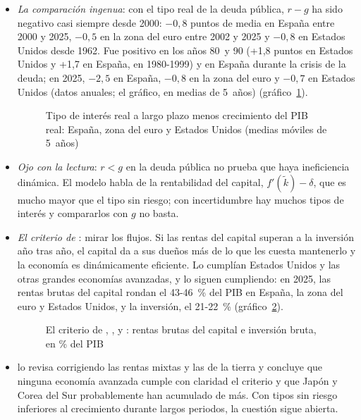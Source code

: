 \documentclass[11pt]{article}
\begin{document}
\begin{itemize}
\item \emph{La comparación ingenua}: con el tipo real de la deuda pública, $r-g$ ha sido negativo casi siempre desde 2000: $-0{,}8$ puntos de media en España entre 2000 y 2025, $-0{,}5$ en la zona del euro entre 2002 y 2025 y $-0{,}8$ en Estados Unidos desde 1962. Fue positivo en los años 80~y 90 (+1,8 puntos en Estados Unidos y +1,7 en España, en 1980-1999) y en España durante la crisis de la deuda; en 2025, $-2{,}5$ en España, $-0{,}8$ en la zona del euro y $-0{,}7$ en Estados Unidos (datos anuales; el gráfico, en medias de 5~años)\nocite{CE2026AMECO} (gráfico~\ref{fig:r-menos-g}).
  \begin{figure}[H]
  \centering
  \caption{Tipo de interés real a largo plazo menos crecimiento del PIB real: España, zona del euro y Estados Unidos (medias móviles de 5~años)}\label{fig:r-menos-g}
  \end{figure}
\item \emph{Ojo con la lectura}: $r<g$ en la deuda pública no prueba que haya ineficiencia dinámica. El modelo habla de la rentabilidad del capital, $f'(\tilde k)-\delta$, que es mucho mayor que el tipo sin riesgo; con incertidumbre hay muchos tipos de interés y compararlos con $g$ no basta\nocite{AbelEtAl1989Assessing,Blanchard2019Deuda}.
\item \emph{El criterio de \textcite{AbelEtAl1989Assessing}}: mirar los flujos. Si las rentas del capital superan a la inversión año tras año, el capital da a sus dueños más de lo que les cuesta mantenerlo y la economía es dinámicamente eficiente. Lo cumplían Estados Unidos y las otras grandes economías avanzadas, y lo siguen cumpliendo: en 2025, las rentas brutas del capital rondan el 43-46~\% del PIB en España, la zona del euro y Estados Unidos, y la inversión, el 21-22~\%\nocite{CE2026AMECO} (gráfico~\ref{fig:criterio-abel}).
  \begin{figure}[H]
  \centering
  \caption{El criterio de , ,  y : rentas brutas del capital e inversión bruta, en \% del PIB}\label{fig:criterio-abel}
  \end{figure}
\item \textcite{Geerolf2018Reassessing} lo revisa corrigiendo las rentas mixtas y las de la tierra y concluye que ninguna economía avanzada cumple con claridad el criterio y que Japón y Corea del Sur probablemente han acumulado de más. Con tipos sin riesgo inferiores al crecimiento durante largos periodos\nocite{Blanchard2019Deuda}, la cuestión sigue abierta.
\end{itemize}
\end{document}
